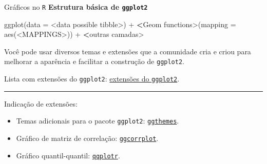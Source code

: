 \documentclass[
  10pt,
  ignorenonframetext,
]{beamer}
\newenvironment{Shaded}{}{}
\newcommand{\DataTypeTok}[1]{#1}
\newcommand{\ErrorTok}[1]{\textcolor[rgb]{1.00,0.00,0.00}{\textbf{#1}}}
\newcommand{\KeywordTok}[1]{\textcolor[rgb]{0.00,0.00,1.00}{#1}}
\newcommand{\NormalTok}[1]{#1}
\newcommand{\OperatorTok}[1]{#1}
\newcommand{\StringTok}[1]{\textcolor[rgb]{0.00,0.50,0.50}{#1}}
\providecommand{\tightlist}{%
  \setlength{\itemsep}{0pt}\setlength{\parskip}{0pt}}
\begin{document}
\begin{frame}[fragile]{Gráficos no \texttt{R}}
\protect\hypertarget{gruxe1ficos-no-r-1}{}
\textbf{Estrutura básica de \texttt{ggplot2}}

\begin{Shaded}
\begin{Highlighting}[]
\KeywordTok{ggplot}\NormalTok{(}\DataTypeTok{data =} \OperatorTok{\textless{}}\NormalTok{data possible tibble}\OperatorTok{\textgreater{}}\NormalTok{) }\OperatorTok{+}
\StringTok{  }\ErrorTok{\textless{}}\NormalTok{Geom functions}\OperatorTok{\textgreater{}}\NormalTok{(}\DataTypeTok{mapping =} \KeywordTok{aes}\NormalTok{(}\OperatorTok{\textless{}}\NormalTok{MAPPINGS}\OperatorTok{\textgreater{}}\NormalTok{)) }\OperatorTok{+}
\StringTok{  }\ErrorTok{\textless{}}\NormalTok{outras camadas}\OperatorTok{\textgreater{}}
\end{Highlighting}
\end{Shaded}

Você pode usar diversos temas e extensões que a comunidade cria e criou
para melhorar a aparência e facilitar a construção de \texttt{ggplot2}.

Lista com extensões do \texttt{ggplot2}:
\href{https://exts.ggplot2.tidyverse.org/gallery/}{extensões do
\texttt{ggplot2}}.

\rule{\textwidth}{0.5pt}

Indicação de extensões:

\begin{itemize}
\tightlist
\item
  Temas adicionais para o pacote \texttt{ggplot2}:
  \href{https://github.com/jrnold/ggthemes}{\texttt{ggthemes}}.
\item
  Gráfico de matriz de correlação:
  \href{https://rpkgs.datanovia.com/ggcorrplot/}{\texttt{ggcorrplot}}.
\item
  Gráfico quantil-quantil:
  \href{https://github.com/aloy/qqplotr}{\texttt{qqplotr}}.
\end{itemize}
\end{frame}
\end{document}
